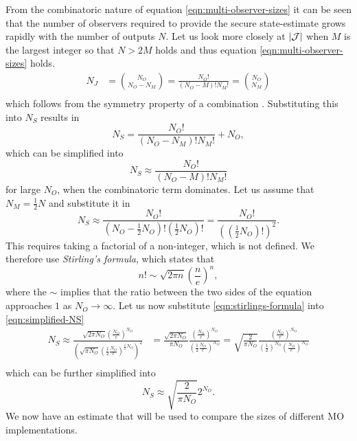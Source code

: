 From the combinatoric nature of equation \eqref{eqn:multi-observer-sizes} it can be seen that the number of observers required to provide the secure state-estimate grows rapidly with the number of outputs $N$. Let us look more closely at $|\mathcal{J}|$ when $M$ is the largest integer so that $N>2M$ holds and thus equation \eqref{eqn:multi-observer-sizes} holds.
\begin{equation*}
    \begin{split}
        N_J &= {N_O \choose N_O-N_M}  = \frac{N_O!}{(N_O-M)!N_M!} = {N_O \choose N_M} \\
    \end{split}
\end{equation*}
which follows from the symmetry property of a combination \cite[Section 1.1]{Mazur2010PrinciplesCombinatorics}. Substituting this into $N_S$ results in
\begin{equation*}
    N_S = \frac{N_O!}{(N_O-N_M)!N_M!} + N_O,
\end{equation*}
which can be simplified into
\begin{equation*}
    N_S \approx \frac{N_O!}{(N_O-M)!N_M!}
\end{equation*}
for large $N_O$, when the combinatoric term dominates. Let us assume that $N_M=\frac{1}{2}N$ and substitute it in
\begin{equation}\label{eqn:simplified-NS}
    N_S \approx \frac{N_O!}{(N_O-\frac{1}{2}N_O)!(\frac{1}{2}N_O)!} = \frac{N_O!}{\left( \left( \frac{1}{2}N_O \right) ! \right)^2}.
\end{equation}
This requires taking a factorial of a non-integer, which is not defined. We therefore use \textit{Stirling's formula}\cite{Beals2012GammaZeta}, which states that
\begin{equation}\label{eqn:stirlings-formula}
    n! \sim \sqrt{2\pi n} \left( \frac{n}{e} \right)^n,
\end{equation}
where the $\sim$ implies that the ratio between the two sides of the equation approaches $1$ as $N_O \rightarrow \infty$. Let us now substitute \eqref{eqn:stirlings-formula} into \eqref{eqn:simplified-NS}
\begin{equation*}
    \begin{split}
        N_S \approx  \frac{\sqrt{2 \pi N_O}( \frac{N_O}{e} )^{N_O}}{\left( \sqrt{\pi N_O}(\frac{1}{2} \frac{N_O}{e} )^{\frac{1}{2}N_O} \right)^2} &= \frac{\sqrt{2 \pi N_O}}{\pi N_O} \frac{( \frac{N_O}{e} )^{N_O}}{(\frac{1}{2} \frac{N_O}{e} )^{N_O}} = \sqrt{\frac{2}{\pi N_O}} \frac{( \frac{N_O}{e} )^{N_O}}{(\frac{1}{2})^{N_O} (\frac{N_O}{e} )^{N_O}} \\
    \end{split}
\end{equation*}
which can be further simplified into
\begin{equation}\label{eqn:NS-approximation}
    N_S \approx \sqrt{\frac{2}{\pi N_O}}2^{N_O}.
\end{equation}
We now have an estimate that will be used to compare the sizes of different MO implementations.